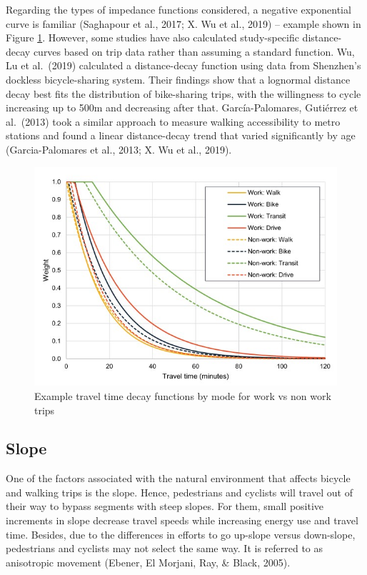 \documentclass[
11pt, %
oneside, %
english, %
singlespacing, %
]{macthesis} %
\begin{document}
Regarding the types of impedance functions considered, a negative exponential curve is familiar (Saghapour et al., 2017; X. Wu et al., 2019) -- example shown in Figure \ref{fig:initiative}. However, some studies have also calculated study-specific distance-decay curves based on trip data rather than assuming a standard function. Wu, Lu et al.~(2019) calculated a distance-decay function using data from Shenzhen's dockless bicycle-sharing system. Their findings show that a lognormal distance decay best fits the distribution of bike-sharing trips, with the willingness to cycle increasing up to 500m and decreasing after that. García-Palomares, Gutiérrez et al.~(2013) took a similar approach to measure walking accessibility to metro stations and found a linear distance-decay trend that varied significantly by age (Garcia-Palomares et al., 2013; X. Wu et al., 2019).

\begin{figure}

{\centering \includegraphics[width=0.9\linewidth]{figure/ch02-Fig-02} 

}

\caption{Example travel time decay functions by mode for work vs non work trips}\label{fig:initiative}
\end{figure}

\hypertarget{slope}{%
\subsection{Slope}\label{slope}}

One of the factors associated with the natural environment that affects bicycle and walking trips is the slope. Hence, pedestrians and cyclists will travel out of their way to bypass segments with steep slopes. For them, small positive increments in slope decrease travel speeds while increasing energy use and travel time. Besides, due to the differences in efforts to go up-slope versus down-slope, pedestrians and cyclists may not select the same way. It is referred to as anisotropic movement (Ebener, El Morjani, Ray, \& Black, 2005).
\end{document}
